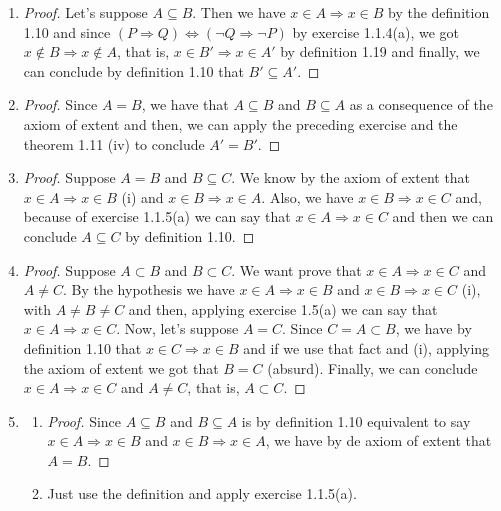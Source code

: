 \documentclass{article}
\begin{document}
\begin{enumerate}
		 	\item[3.] \begin{proof}
		 		Let's suppose $A \subseteq B$. Then we have $x \in A \Rightarrow x \in B$ by the definition 1.10 and since $(P \Rightarrow Q) \Leftrightarrow (\neg Q \Rightarrow \neg P)$ by exercise 1.1.4(a), we got $x \notin B \Rightarrow x \notin A$, that is, $x \in B' \Rightarrow x \in A'$ by definition 1.19 and finally, we can conclude by definition 1.10 that $B' \subseteq A'$.
		 	\end{proof}
		 	
		 	\item[4.] \begin{proof}
		 		Since $A = B$, we have that $A \subseteq B$ and $B \subseteq A$ as a consequence of the axiom of extent and then, we can apply the preceding exercise and the theorem 1.11 (iv) to conclude $A' = B'$.
		 	\end{proof}
		 	
		 	\item[5.] \begin{proof}
		 		Suppose $A = B$ and $B \subseteq C$. We know by the axiom of extent that $x \in A \Rightarrow x \in B$ (i) and $x \in B \Rightarrow x \in A$. Also, we have $x \in B \Rightarrow x \in C$ and, because of exercise 1.1.5(a) we can say that $x \in A \Rightarrow x \in C$ and then we can conclude $A \subseteq C$ by definition 1.10.
		 	\end{proof}
		 	
		 	\item[6.] \begin{proof}
		 	 Suppose $A \subset B$ and $B \subset C$. We want prove that $x \in A \Rightarrow x \in C$ and $A \neq C$. By the hypothesis we have $x \in A \Rightarrow x \in B$ and $x \in B \Rightarrow x \in C$ (i), with $A \neq B \neq C$ and then, applying exercise 1.5(a) we can say that $x \in A \Rightarrow x \in C$. Now, let's suppose $A = C$. Since $C = A \subset B$, we have by definition 1.10 that $x \in C \Rightarrow x \in B$ and if we use that fact and (i), applying the axiom of extent we got that $B = C$ (absurd). Finally, we can conclude $x \in A \Rightarrow x \in C$ and $A \neq C$, that is, $A \subset C$.\end{proof}
		
		\item[7.] \begin{enumerate}
			\item[iv)] \begin{proof}Since $A \subseteq B$ and $B \subseteq A$ is by definition 1.10 equivalent to say $x \in A \Rightarrow x \in B$ and $x \in B \Rightarrow x \in A$, we have by de axiom of extent that $A = B$. \end{proof}
			\item[v)] Just use the definition and apply exercise 1.1.5(a).
		\end{enumerate}
		

\end{enumerate}
\end{document}
